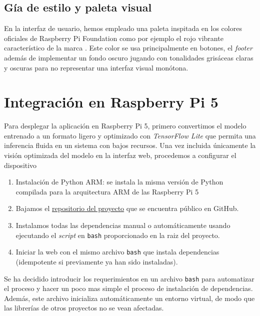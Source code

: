 \subsection{Gía de estilo y paleta visual}
En la interfaz de usuario, hemos empleado una paleta inspitada en los colores oficiales de Raspberry Pi Foundation como por ejemplo el rojo  vibrante característico de la marca \cite{web:raspberrypi_colours}. Este color se usa principalmente en botones, el \textit{footer} además de implementar un fondo oscuro jugando con tonalidades grisáceas claras y oscuras para no representar una interfaz visual monótona. 



\section{Integración en Raspberry Pi 5}
Para desplegar la aplicación en Raspberry Pi 5, primero convertimos el modelo entrenado a un formato ligero y optimizado con \textit{TensorFlow Lite} que permita una inferencia fluida en un sistema con bajos recursos. Una vez incluida únicamente la visión optimizada del modelo en la interfaz web, procedemos a configurar el dispositivo

\begin{enumerate}
    \item Instalación de Python ARM: se instala la misma versión de Python compilada para la arquitectura ARM de las Raspberry Pi 5

    \item Bajamos el \href{https://github.com/hgomezmartin/HandSignDetectionProject}{repositorio del proyecto} que se encuentra público en GitHub.

    \item Instalamos todas las dependencias manual o automáticamente usando ejecutando el \textit{script} en \texttt{bash} proporcionado en la raiz del proyecto.

    \item Iniciar la web con el mismo archivo \texttt{bash} que instala dependencias (idempotente si previamente ya han sido instaladas).
\end{enumerate}

Se ha decidido introducir los requerimientos en un archivo \texttt{bash} para automatizar el proceso y hacer un poco mas simple el proceso de instalación de dependencias. Además, este archivo inicializa automáticamente un entorno virtual, de modo que las librerías de otros proyectos no se vean afectadas.

